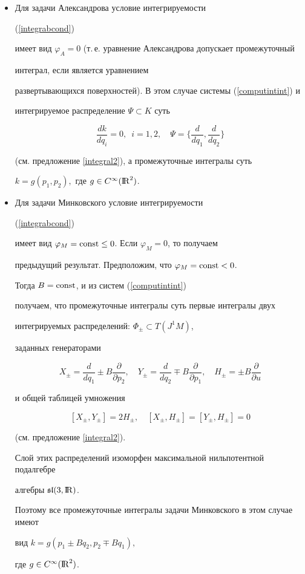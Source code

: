 \begin{itemize}


\item[1.] Для задачи Александрова условие интегрируемости


(\ref{integrabcond})


имеет вид $\varphi_A=0$ (т.\,е. уравнение Александрова допускает промежуточный 


интеграл, если является уравнением


развертывающихся поверхностей). В этом случае системы (\ref{computintint}) и 


интегрируемое распределение $\Psi \subset K$ суть


$$


\frac{dk}{dq_i}=0,\ \; i=1,2,\quad


\Psi =\bigg\{\frac d{dq_1},\frac d{dq_2}\bigg\}


$$


(см. предложение \ref{integral2}), а промежуточные интегралы суть 


$k=g(p_1,p_2),$ где $g\in C^\infty ({\mathrm{I\!R}}^2)$.


\item[2.] Для задачи Минковского условие интегрируемости


(\ref{integrabcond})


имеет вид $\varphi_M={\operatorname{const}}\leq 0$. Если $\varphi_M=0$, то получаем


предыдущий результат. Предположим, что $\varphi_M={\operatorname{const}}<0$.


Тогда $B={\operatorname{const}}$, и из систем (\ref{computintint})


получаем, что промежуточные интегралы суть первые интегралы двух


интегрируемых распределений: $\Phi_{\pm }\subset T(J^1M)$,


заданных генераторами


$$


X_{\pm }=\frac d{dq_1}\pm B\frac \partial {\partial p_2},\quad


Y_{\pm }=\frac d{dq_2}\mp B\frac \partial {\partial p_1},\quad


H_{\pm }=\pm B\frac \partial{\partial u}


$$


и общей таблицей умножения


$$


[X_{\pm},Y_{\pm}]=2H_{\pm},\quad [X_{\pm},H_{\pm}]=[Y_{\pm },H_{\pm }]=0


$$


(см. предложение \ref{integral2}).


Слой этих распределений изоморфен максимальной нильпотентной подалгебре


алгебры ${\frak s\frak l}(3,{\mathrm{I\!R}})$.


Поэтому все промежуточные интегралы задачи Минковского в этом случае имеют 


вид $k=g(p_1\pm Bq_2,p_2\mp Bq_1),$


где $g\in C^\infty ({\mathrm{I\!R}}^2)$.


\end{itemize}





